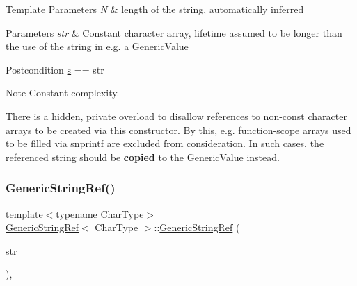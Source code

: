 \begin{DoxyTemplParams}{Template Parameters}
{\em N} & length of the string, automatically inferred\\
\hline
\end{DoxyTemplParams}

\begin{DoxyParams}{Parameters}
{\em str} & Constant character array, lifetime assumed to be longer than the use of the string in e.\+g. a \hyperlink{classGenericValue}{Generic\+Value}\\
\hline
\end{DoxyParams}
\begin{DoxyPostcond}{Postcondition}
\hyperlink{structGenericStringRef_aec7a5900ea6f3e42f0ea8403d5135103}{s} == str
\end{DoxyPostcond}
\begin{DoxyNote}{Note}
Constant complexity. 

There is a hidden, private overload to disallow references to non-\/const character arrays to be created via this constructor. By this, e.\+g. function-\/scope arrays used to be filled via {\ttfamily snprintf} are excluded from consideration. In such cases, the referenced string should be {\bfseries copied} to the \hyperlink{classGenericValue}{Generic\+Value} instead. 
\end{DoxyNote}
\mbox{\label{structGenericStringRef_a9e80d81d5ad49cf0fb4128ace8c548d9}} 
\subsubsection{\texorpdfstring{Generic\+String\+Ref()}{GenericStringRef()}\hspace{0.1cm}{\footnotesize\ttfamily [5/6]}}
{\footnotesize\ttfamily template$<$typename Char\+Type$>$ \\
\hyperlink{structGenericStringRef}{Generic\+String\+Ref}$<$ Char\+Type $>$\+::\hyperlink{structGenericStringRef}{Generic\+String\+Ref} (\begin{DoxyParamCaption}\item[{const Char\+Type $\ast$}]{str }\end{DoxyParamCaption})\hspace{0.3cm}{\ttfamily [inline]}, {\ttfamily [explicit]}}



